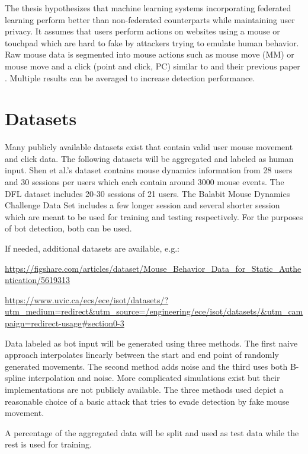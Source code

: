 \documentclass[
    fontsize=12pt,
    headings=small,
    parskip=half,           %
    bibliography=totoc,
    numbers=noenddot,       %
    open=any,               %
    final                   %
    ]{scrreprt}
\begin{document}
The thesis hypothesizes that machine learning systems incorporating federated learning perform better than non-federated counterparts while maintaining user privacy. It assumes that users perform actions on websites using a mouse or touchpad which are hard to fake by attackers trying to emulate human behavior. Raw mouse data is segmented into mouse actions such as mouse move (MM) or mouse move and a click (point and click, PC) similar to \cite{9111596} and their previous paper \cite{DBLP:journals/corr/abs-1810-04668}. Multiple results can be averaged to increase detection performance.

\section{Datasets}

Many publicly available datasets exist that contain valid user mouse movement and click data. The following datasets will be aggregated and labeled as human input.
Shen et al.'s \cite{6263955} dataset contains mouse dynamics information from 28 users and 30 sessions per users which each contain around 3000 mouse events.
The DFL dataset \cite{9111596} includes 20-30 sessions of 21 users.
The Balabit Mouse Dynamics Challenge Data Set \cite{BALABIT_CHALLENGE} includes a few longer session and several shorter session which are meant to be used for training and testing respectively. For the purposes of bot detection, both can be used.

If needed, additional datasets are available, e.g.:

\url{https://figshare.com/articles/dataset/Mouse_Behavior_Data_for_Static_Authentication/5619313}

\url{https://www.uvic.ca/ecs/ece/isot/datasets/?utm_medium=redirect&utm_source=/engineering/ece/isot/datasets/&utm_campaign=redirect-usage#section0-3}

Data labeled as bot input will be generated using three methods. The first naive approach interpolates linearly between the start and end point of randomly generated movements. The second method adds noise and the third uses both B-spline interpolation and noise. More complicated simulations exist but their implementations are not publicly available. \cite{8275816} \cite{Nazar2003} The three methods used depict a reasonable choice of a basic attack that tries to evade detection by fake mouse movement.


A percentage of the aggregated data will be split and used as test data while the rest is used for training.
\end{document}
